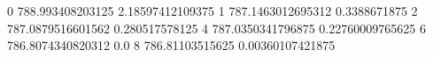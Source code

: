 0 788.993408203125 2.18597412109375
1 787.1463012695312 0.3388671875
2 787.0879516601562 0.280517578125
4 787.0350341796875 0.22760009765625
6 786.8074340820312 0.0
8 786.81103515625 0.00360107421875
